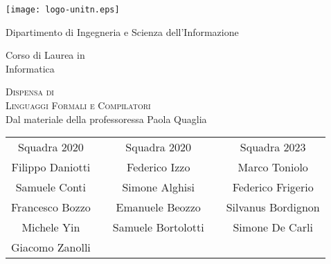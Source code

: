 \documentclass[class=book, crop=false, oneside]{standalone}
\begin{document}
\begin{titlepage}
	\centering
	\texttt{[image: logo-unitn.eps]}

	\vspace{1.3cm}
	\LARGE{Dipartimento di Ingegneria e Scienza dell'Informazione\\}

	\vspace{.9cm}
	\Large{Corso di Laurea in\\ Informatica}

	\vspace{.9cm}
	\Huge\textsc{Dispensa di\\Linguaggi Formali e Compilatori\\}
	\vspace{.2cm}
	\large{Dal materiale della professoressa Paola Quaglia}

	\vspace{1.8cm}
	\begin{tabularx}{\textwidth}{cXcXc}
		\Large{Squadra 2020} && \Large{Squadra 2020} && \Large{Squadra 2023} \\
		\cmidrule(lr){1-1} \cmidrule(lr){3-3} \cmidrule(lr){5-5}
		\large{Filippo Daniotti} && \large{Federico Izzo} && \large{Marco Toniolo}  \\
		\large{Samuele Conti} && \large{Simone Alghisi} &&  \large{Federico Frigerio}\\
		\large{Francesco Bozzo} && \large{Emanuele Beozzo} && \large{Silvanus Bordignon} \\
		\large{Michele Yin} && \large{Samuele Bortolotti} && \large{Simone De Carli}\\
		\large{Giacomo Zanolli} && && \\
	\end{tabularx}

\end{titlepage}
\end{document}
